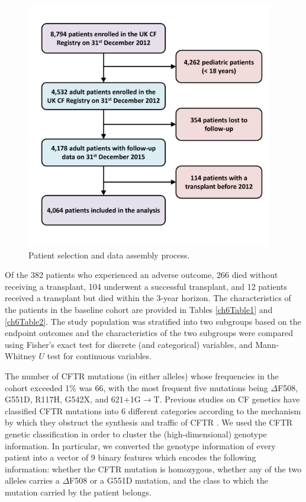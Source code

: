 \documentclass [PhD] {uclathes}
\begin{document}
\begin{figure}[t]
\centering
\includegraphics[width=4.25in]{ch6Fig1.pdf}
\caption{Patient selection and data assembly process.}
\label{ch6fig1}
\end{figure}

Of the 382 patients who experienced an adverse outcome, 266 died without receiving a transplant, 104 underwent a successful transplant, and 12 patients received a transplant but died within the 3-year horizon. The characteristics of the patients in the baseline cohort are provided in Tables \ref{ch6Table1} and \ref{ch6Table2}. The study population was stratified into two subgroups based on the endpoint outcomes and the characteristics of the two subgroups were compared using Fisher's exact test for discrete (and categorical) variables, and Mann-Whitney $U$ test for continuous variables. 

The number of CFTR mutations (in either alleles) whose frequencies in the cohort exceeded 1$\%$ was 66, with the most frequent five mutations being $\Delta$F508, G551D, R117H, G542X, and 621+1G$\rightarrow$T. Previous studies on CF genetics have classified CFTR mutations into 6 different categories according to the mechanism by which they obstruct the synthesis and traffic of CFTR \cite{fanen2014genetics}. We used the CFTR genetic classification in order to cluster the (high-dimensional) genotype information. In particular, we converted the  genotype information of every patient into a vector of 9 binary features which encodes the following information: whether the CFTR mutation is homozygous, whether any of the two alleles carries a $\Delta$F508 or a G551D mutation, and the class to which the mutation carried by the patient belongs. 
\end{document}
